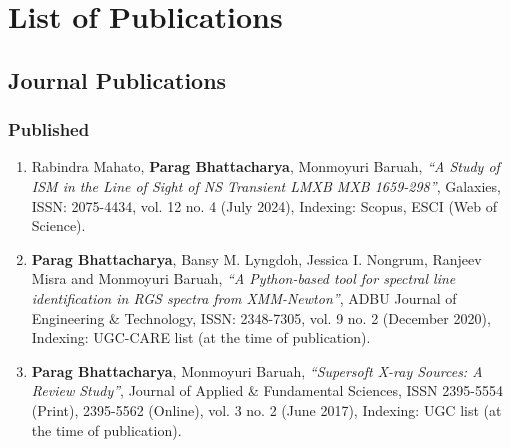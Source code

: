 \chapter{List of Publications} \label{appendix:publications}

    \section{Journal Publications}
    	\subsection{Published}
    		\begin{enumerate}
    			\item Rabindra Mahato, \textbf{Parag Bhattacharya}, Monmoyuri Baruah, \textit{``A Study of ISM in the Line of Sight of NS Transient LMXB MXB 1659-298''}, Galaxies, ISSN: 2075-4434, vol. 12 no. 4 (July 2024), Indexing: Scopus, ESCI (Web of Science). \label{paper-galaxies}
    			
    			\item \textbf{Parag Bhattacharya}, Bansy M. Lyngdoh, Jessica I. Nongrum, Ranjeev Misra and Monmoyuri Baruah, \textit{``A Python-based tool for spectral line identification in RGS spectra from XMM-Newton''}, ADBU Journal of Engineering \& Technology, ISSN: 2348-7305, vol. 9 no. 2 (December 2020), Indexing: UGC-CARE list (at the time of publication). \label{paper-ajet}

    			\item \textbf{Parag Bhattacharya}, Monmoyuri Baruah, \textit{``Supersoft X-ray Sources: A Review Study''}, Journal of Applied \& Fundamental Sciences, ISSN 2395-5554 (Print), 2395-5562 (Online), vol. 3 no. 2 (June 2017), Indexing: UGC list (at the time of publication). \label{paper-jafs}
    		\end{enumerate}
    	
    		
